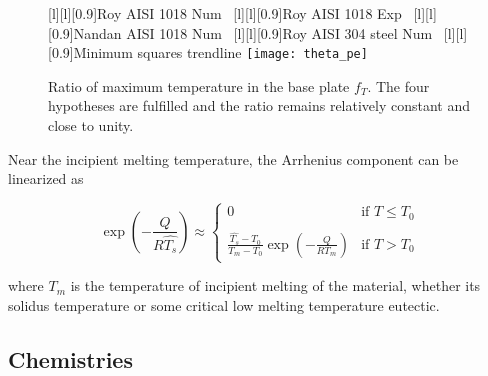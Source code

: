 \documentclass[review, 1p, number, sort&compress,table]{elsarticle}
\begin{document}
\begin{figure*}[!h]
				[l][l][0.9]{\scriptsize Roy \etal AISI 1018 Num~\cite{roy06}}
				[l][l][0.9]{\scriptsize Roy \etal AISI 1018 Exp~\cite{roy06}}
				[l][l][0.9]{\scriptsize Nandan \etal AISI 1018 Num~\cite{nandan06mmta1247}}
				[l][l][0.9]{\scriptsize Roy \etal AISI 304 steel Num~\cite{roy06}}
				[l][l][0.9]{\scriptsize Minimum squares trendline}
				\texttt{[image: theta\_pe]}
				\caption{Ratio of maximum temperature in the base plate $f_T$. The four hypotheses are fulfilled and the ratio
				remains relatively constant and close to unity.}
				\label{fig:theta-pe}
		\end{figure*}
\fi

Near the incipient melting temperature, the Arrhenius component can be linearized as

\begin{equation}\label{eq:arrhenius_simplified}
	\exp\left(-\frac Q{R\widehat{T_s}}\right)\approx\left\{
	\begin{array}{cl}
	0&\mbox{if }T\leq T_0\\ \\\displaystyle{
	\frac{\widehat{T_s}-T_0}{T_m-T_0}\exp\left(-\frac{Q}{RT_m}\right)}&\mbox{if
	}T>T_0
	\end{array}
	\right.
\end{equation}

where $T_m$ is the temperature of incipient melting of the material, whether its solidus temperature or some critical
low melting temperature eutectic.

\subsection{Chemistries}
	
\end{document}
